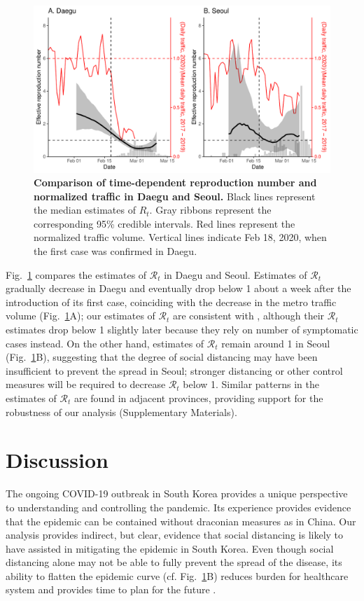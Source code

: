 \documentclass[12pt]{article}
\newcommand{\fref}[1]{Fig.~\ref{fig:#1}}
\begin{document}
\begin{figure}[!ht]
\includegraphics[width=\textwidth]{figure_compare_R_t.pdf}
\caption{
\textbf{Comparison of time-dependent reproduction number and normalized traffic in Daegu and Seoul.}
Black lines represent the median estimates of $R_t$. 
Gray ribbons represent the corresponding 95\% credible intervals.
Red lines represent the normalized traffic volume.
Vertical lines indicate Feb 18, 2020, when the first case was confirmed in Daegu.
}
\label{fig:eff}
\end{figure}

\fref{eff} compares the estimates of $\mathcal R_t$ in Daegu and Seoul.
Estimates of $\mathcal R_t$ gradually decrease in Daegu and eventually drop below 1 about a week after the introduction of its first case, coinciding with the decrease in the metro traffic volume (\fref{eff}A);
our estimates of $\mathcal R_t$ are consistent with \cite{tempvar}, although their $\mathcal R_t$ estimates drop below 1 slightly later because they rely on number of symptomatic cases instead.
On the other hand, estimates of $\mathcal R_t$ remain around 1 in Seoul (\fref{eff}B), suggesting that the degree of social distancing may have been insufficient to prevent the spread in Seoul;
stronger distancing or other control measures will be required to decrease $\mathcal R_t$ below 1.
Similar patterns in the estimates of $\mathcal R_t$ are found in adjacent provinces, providing support for the robustness of our analysis (Supplementary Materials).

\section{Discussion}

The ongoing COVID-19 outbreak in South Korea provides a unique perspective to understanding and controlling the pandemic.
Its experience provides evidence that the epidemic can be contained without draconian measures as in China.
Our analysis provides indirect, but clear, evidence that social distancing is likely to have assisted in mitigating the epidemic in South Korea.
Even though social distancing alone may not be able to fully prevent the spread of the disease, its ability to flatten the epidemic curve (cf. \fref{eff}B) reduces burden for healthcare system and provides time to plan for the future \citep{anderson2020will}.
\end{document}
